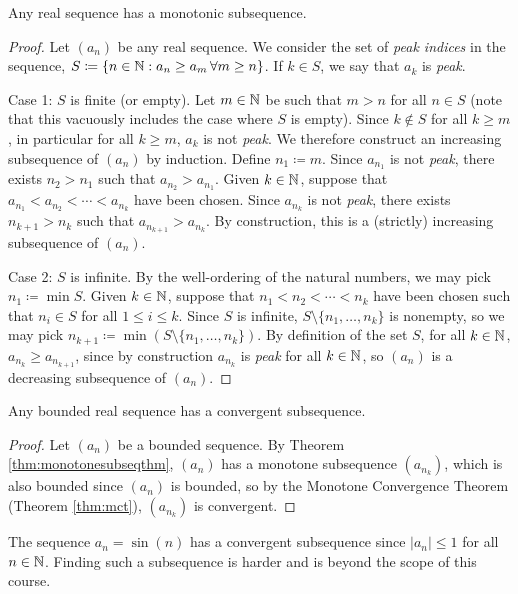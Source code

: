 \documentclass[../analysis1.tex]{subfiles}
\begin{document}
\begin{theorem}
\label{thm:monotonesubseqthm}
    \begin{shaded*}
        Any real sequence has a monotonic subsequence.
    \end{shaded*}
\end{theorem}
\begin{proof}
    Let $(a_n)$ be any real sequence. We consider the set of \textit{peak indices} in the sequence, $S\coloneqq\{n\in\mathbb{N}:a_n\ge a_m\, \forall m \ge n\}$. If $k\in S$, we say that $a_k$ is \textit{peak}.\par
    Case 1: $S$ is finite (or empty). Let $m\in\mathbb{N}$ be such that $m>n$ for all $n\in S$ (note that this vacuously includes the case where $S$ is empty). Since $k\notin S$ for all $k\ge m$, in particular for all $k\ge m$, $a_k$ is not \textit{peak}. We therefore construct an increasing subsequence of $(a_n)$ by induction.
    Define $n_1\coloneqq m$. Since $a_{n_1}$ is not \textit{peak}, there exists $n_2>n_1$ such that $a_{n_2}>a_{n_1}$. Given $k\in\mathbb{N}$, suppose that $a_{n_1}<a_{n_2}<\cdots<a_{n_k}$ have been chosen. Since $a_{n_k}$ is not \textit{peak}, there exists $n_{k+1}>n_k$ such that $a_{n_{k+1}}>a_{n_k}$. By construction, this is a (strictly) increasing subsequence of $(a_n)$.\par
    Case 2: $S$ is infinite. By the well-ordering of the natural numbers, we may pick $n_1\coloneqq\min S$. Given $k\in\mathbb{N}$, suppose that $n_1<n_2<\cdots<n_k$ have been chosen such that $n_i\in S$ for all $1\le i\le k$. Since $S$ is infinite, $S\setminus\{n_1,\dots,n_k\}$ is nonempty, so we may pick $n_{k+1}\coloneqq \min (S\setminus\{n_1,\dots,n_k\})$. By definition of the set $S$, for all $k\in\mathbb{N}$, $a_{n_k}\ge a_{n_{k+1}}$, since by construction $a_{n_k}$ is \textit{peak} for all $k\in\mathbb{N}$, so $(a_n)$ is a decreasing subsequence of $(a_n)$.\qedhere
\end{proof}

\begin{theorem}
\label{thm:bw}
    \begin{shaded*}
        Any bounded real sequence has a convergent subsequence.
    \end{shaded*}
\end{theorem}
\begin{proof}
    Let $(a_n)$ be a bounded sequence. By Theorem \ref{thm:monotonesubseqthm}, $(a_n)$ has a monotone subsequence $(a_{n_k})$, which is also bounded since $(a_n)$ is bounded, so by the Monotone Convergence Theorem (Theorem \ref{thm:mct}), $(a_{n_k})$ is convergent.\qedhere
\end{proof}
\begin{example}
    The sequence $a_n=\sin (n)$ has a convergent subsequence since $|a_n|\le 1$ for all $n\in\mathbb{N}$. Finding such a subsequence is harder and is beyond the scope of this course.
\end{example}
\end{document}
